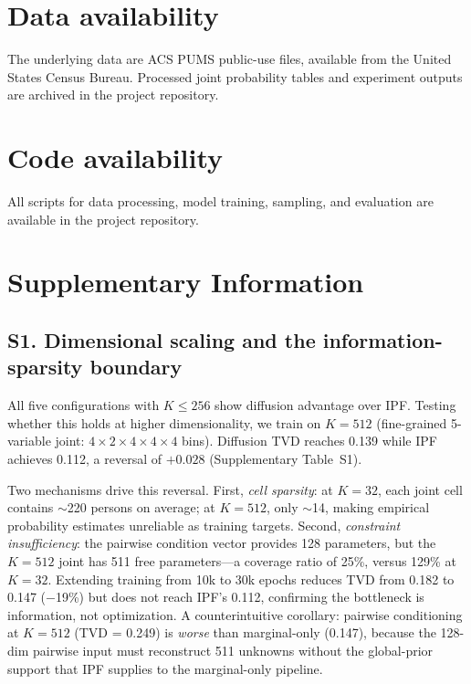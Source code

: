 \documentclass[11pt]{article}
\begin{document}
\FloatBarrier
\section{Data availability}
The underlying data are ACS PUMS public-use files, available from the United States Census Bureau. Processed joint probability tables and experiment outputs are archived in the project repository.

\section{Code availability}
All scripts for data processing, model training, sampling, and evaluation are available in the project repository.




\clearpage
\appendix
\section*{Supplementary Information}

\subsection*{S1. Dimensional scaling and the information-sparsity boundary}

All five configurations with $K\leq256$ show diffusion advantage over IPF. Testing whether this holds at higher dimensionality, we train on $K=512$ (fine-grained 5-variable joint: $4\times2\times4\times4\times4$ bins). Diffusion TVD reaches 0.139 while IPF achieves 0.112, a reversal of $+0.028$ (Supplementary Table~S1).

Two mechanisms drive this reversal. First, \textit{cell sparsity}: at $K=32$, each joint cell contains $\sim$220 persons on average; at $K=512$, only $\sim$14, making empirical probability estimates unreliable as training targets. Second, \textit{constraint insufficiency}: the pairwise condition vector provides 128 parameters, but the $K=512$ joint has 511 free parameters---a coverage ratio of 25\%, versus 129\% at $K=32$. Extending training from 10k to 30k epochs reduces TVD from 0.182 to 0.147 ($-$19\%) but does not reach IPF's 0.112, confirming the bottleneck is information, not optimization. A counterintuitive corollary: pairwise conditioning at $K=512$ (TVD = 0.249) is \textit{worse} than marginal-only (0.147), because the 128-dim pairwise input must reconstruct 511 unknowns without the global-prior support that IPF supplies to the marginal-only pipeline.
\end{document}
